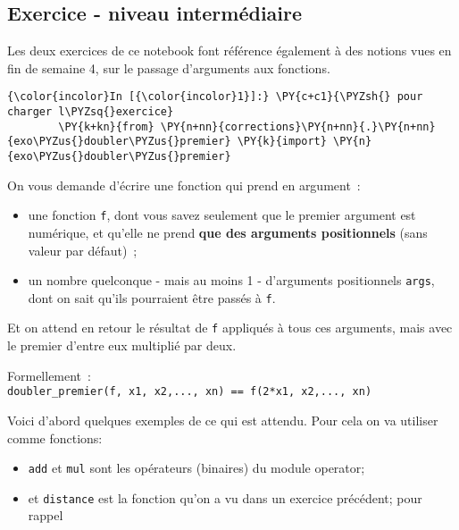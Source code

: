     
    
    
    

    

    \hypertarget{exercice---niveau-intermuxe9diaire}{%
\subsection{Exercice - niveau
intermédiaire}\label{exercice---niveau-intermuxe9diaire}}

    Les deux exercices de ce notebook font référence également à des notions
vues en fin de semaine 4, sur le passage d'arguments aux fonctions.

    \begin{Verbatim}[commandchars=\\\{\},frame=single,framerule=0.3mm,rulecolor=\color{cellframecolor}]
{\color{incolor}In [{\color{incolor}1}]:} \PY{c+c1}{\PYZsh{} pour charger l\PYZsq{}exercice}
        \PY{k+kn}{from} \PY{n+nn}{corrections}\PY{n+nn}{.}\PY{n+nn}{exo\PYZus{}doubler\PYZus{}premier} \PY{k}{import} \PY{n}{exo\PYZus{}doubler\PYZus{}premier}
\end{Verbatim}


    On vous demande d'écrire une fonction qui prend en argument~:

\begin{itemize}
\tightlist
\item
  une fonction \texttt{f}, dont vous savez seulement que le premier
  argument est numérique, et qu'elle ne prend \textbf{que des arguments
  positionnels} (sans valeur par défaut)~;
\item
  un nombre quelconque - mais au moins 1 - d'arguments positionnels
  \texttt{args}, dont on sait qu'ils pourraient être passés à
  \texttt{f}.
\end{itemize}

Et on attend en retour le résultat de \texttt{f} appliqués à tous ces
arguments, mais avec le premier d'entre eux multiplié par deux.

Formellement~:
\texttt{doubler\_premier(f,\ x1,\ x2,...,\ xn)\ ==\ f(2*x1,\ x2,...,\ xn)}

    Voici d'abord quelques exemples de ce qui est attendu. Pour cela on va
utiliser comme fonctions:

\begin{itemize}
\tightlist
\item
  \texttt{add} et \texttt{mul} sont les opérateurs (binaires) du module
  operator;
\item
  et \texttt{distance} est la fonction qu'on a vu dans un exercice
  précédent; pour rappel
\end{itemize}

